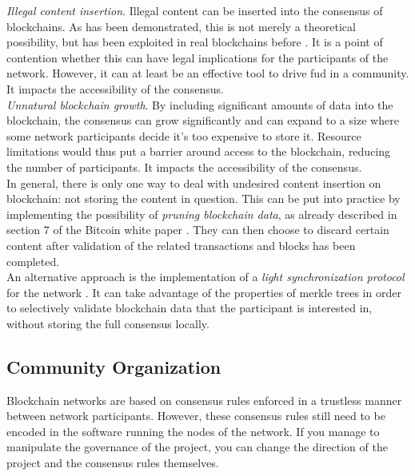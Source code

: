 \documentclass[12pt,a4paper]{article}
\begin{document}
\textit{Illegal content insertion}. Illegal content can be inserted into the \gls{consensus} of \glspl{blockchain}. As has been demonstrated, this is not merely a theoretical possibility, but has been exploited in real \glspl{blockchain} before \cite{content}. It is a point of contention whether this can have legal implications for the participants of the network. However, it can at least be an effective tool to drive \acrfull{fud} in a community. It impacts the accessibility of the \gls{consensus}.\\

\textit{Unnatural blockchain growth}. By including significant amounts of data into the blockchain, the \gls{consensus} can grow significantly and can expand to a size where some network participants decide it's too expensive to store it. Resource limitations would thus put a barrier around access to the \gls{blockchain}, reducing the number of participants. It impacts the accessibility of the \gls{consensus}.\\

In general, there is only one way to deal with undesired content insertion on \gls{blockchain}: not storing the content in question. This can be put into practice by implementing the possibility of \textit{pruning blockchain data}, as already described in section 7 of the Bitcoin white paper \cite{bitcoin}. They can then choose to discard certain content after validation of the related \glspl{transaction} and \glspl{block} has been completed.\\

An alternative approach is the implementation of a \textit{light synchronization protocol} for the network \cite{light}. It can take advantage of the properties of merkle trees in order to selectively validate blockchain data that the participant is interested in, without storing the full \gls{consensus} locally.\\

\subsection{Community Organization}

Blockchain networks are based on consensus rules enforced in a trustless manner between network participants. However, these consensus rules still need to be encoded in the software running the nodes of the network. If you manage to manipulate the governance of the project, you can change the direction of the project and the consensus rules themselves.\\
\end{document}
